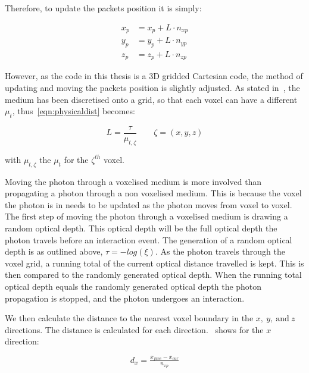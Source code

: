 Therefore, to update the packets position it is simply:

\begin{align}
x_p &= x_p+L\cdot n_{xp}\label{eqn:update1}\\
y_p &= y_p+L\cdot n_{yp}\label{eqn:update2}\\
z_p &= z_p+L\cdot n_{zp}\label{eqn:update3}
\end{align}

However, as the code in this thesis is a 3D gridded Cartesian code, the method of updating and moving the packets position is slightly adjusted. As stated in~, the medium has been discretised onto a grid, so that each voxel can have a different $\mu_t$, thus~\cref{eqn:physicaldist} becomes:

\begin{equation}
L=\frac{\tau}{\mu_{t,\zeta}}\quad\quad \zeta=(x,y,z)
\label{eqn:voxeloptdist}
\end{equation}

with $\mu_{t,\zeta}$ the $\mu_t$ for the $\zeta^{th}$ voxel. 

\medskip

Moving the photon through a voxelised medium is more involved than propagating a photon through a non voxelised medium. 
This is because the voxel the photon is in needs to be updated as the photon moves from voxel to voxel.
The first step of moving the photon through a voxelised medium is drawing a random optical depth.
This optical depth will be the full optical depth the photon travels before an interaction event.
The generation of a random optical depth is as outlined above, $\tau=-log(\xi)$.
As the photon travels through the voxel grid, a running total of the current optical distance travelled is kept.
This is then compared to the randomly generated optical depth.
When the running total optical depth equals the randomly generated optical depth the photon propagation is stopped, and the photon undergoes an interaction.

We then calculate the distance to the nearest voxel boundary in the $x,\ y,\ \text{and}\ z$ directions.
The distance is calculated for each direction.~ shows for the $x$ direction:

\begin{equation}
d_{x} = \tfrac{x_{face} - x_{cur}}{n_{xp}}
\label{eqn:walldist}
\end{equation}


